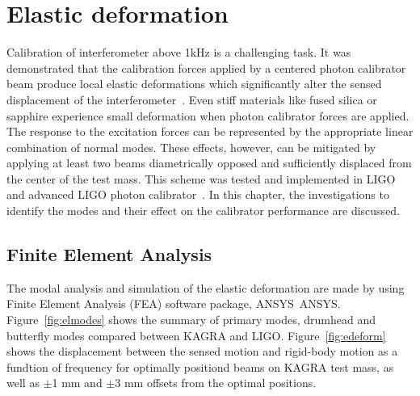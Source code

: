 
\chapter{Elastic deformation} %

\label{Chapter4} %
Calibration of interferometer above 1kHz is a challenging task. 
It was demonstrated that the calibration forces applied by a centered 
photon calibrator beam produce local elastic deformations which 
significantly alter the sensed displacement of the 
interferometer~\cite{Hild:2007,Goetz:2009}.
Even stiff materials like fused silica or sapphire experience small 
deformation when photon calibrator forces are applied. The response to 
the excitation forces can be represented by the appropriate linear 
combination of normal modes. These effects, however, can be mitigated 
by applying at least two beams diametrically opposed and sufficiently 
displaced from the center of the test mass. 
This scheme was tested and implemented in LIGO and advanced LIGO photon 
calibrator~\cite{Daveloza,Karki}.
In this chapter, the investigations to identify 
the modes and their effect on the calibrator performance are discussed.  


\section{Finite Element Analysis}
The modal analysis and simulation of the elastic deformation are made 
by using Finite Element Analysis (FEA) software package, ANSYS~{ANSYS}.
Figure~\ref{fig:elmodes} shows the summary of primary modes, drumhead and 
butterfly modes compared between KAGRA and LIGO.
Figure~\ref{fig:edeform} shows the displacement between the sensed motion 
and rigid-body motion as a fundtion of frequency for optimally positiond 
beams on KAGRA test mass, as well as $\pm$1 mm and $\pm$3 mm offsets from 
the optimal positions.

